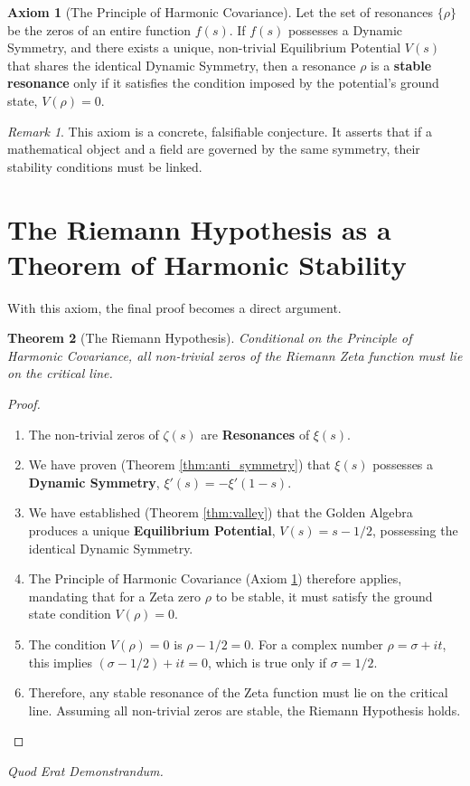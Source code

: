 \documentclass{article}
\theoremstyle{plain}
\newtheorem{theorem}{Theorem}[section]
\theoremstyle{definition}
\newtheorem{axiom}[theorem]{Axiom}
\theoremstyle{remark}
\newtheorem*{remark}{Remark}
\begin{document}
\begin{axiom}[The Principle of Harmonic Covariance]
\label{ax:covariance}
Let the set of resonances $\{\rho\}$ be the zeros of an entire function $f(s)$. If $f(s)$ possesses a Dynamic Symmetry, and there exists a unique, non-trivial Equilibrium Potential $V(s)$ that shares the identical Dynamic Symmetry, then a resonance $\rho$ is a \textbf{stable resonance} only if it satisfies the condition imposed by the potential's ground state, $V(\rho)=0$.
\end{axiom}

\begin{remark}
This axiom is a concrete, falsifiable conjecture. It asserts that if a mathematical object and a field are governed by the same symmetry, their stability conditions must be linked.
\end{remark}

\section{The Riemann Hypothesis as a Theorem of Harmonic Stability}
\label{sec:proof}
With this axiom, the final proof becomes a direct argument.

\begin{theorem}[The Riemann Hypothesis]
Conditional on the Principle of Harmonic Covariance, all non-trivial zeros of the Riemann Zeta function must lie on the critical line.
\end{theorem}
\begin{proof}
\begin{enumerate}
    \item The non-trivial zeros of $\zeta(s)$ are \textbf{Resonances} of $\xi(s)$.
    \item We have proven (Theorem \ref{thm:anti_symmetry}) that $\xi(s)$ possesses a \textbf{Dynamic Symmetry}, $\xi'(s) = -\xi'(1-s)$.
    \item We have established (Theorem \ref{thm:valley}) that the Golden Algebra produces a unique \textbf{Equilibrium Potential}, $V(s) = s - 1/2$, possessing the identical Dynamic Symmetry.
    \item The Principle of Harmonic Covariance (Axiom \ref{ax:covariance}) therefore applies, mandating that for a Zeta zero $\rho$ to be stable, it must satisfy the ground state condition $V(\rho)=0$.
    \item The condition $V(\rho)=0$ is $\rho - 1/2 = 0$. For a complex number $\rho = \sigma + it$, this implies $(\sigma - 1/2) + it = 0$, which is true only if $\sigma = 1/2$.
    \item Therefore, any stable resonance of the Zeta function must lie on the critical line. Assuming all non-trivial zeros are stable, the Riemann Hypothesis holds.
\end{enumerate}
\end{proof}
\begin{center}
\textit{Quod Erat Demonstrandum.}
\end{center}
\end{document}
